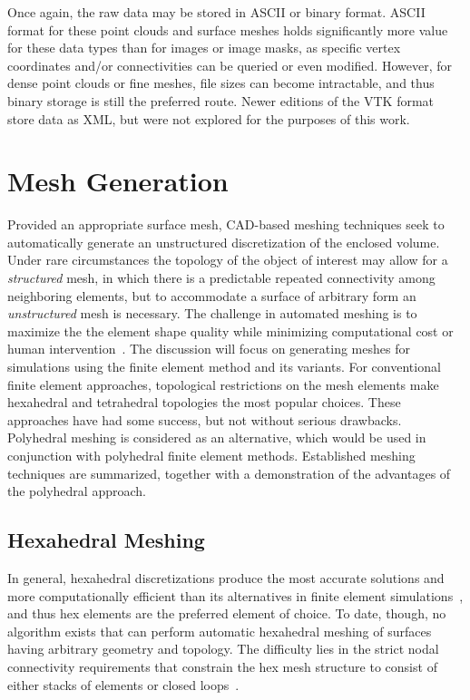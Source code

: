 Once again, the raw data may be stored in ASCII or binary format. ASCII format for these point clouds and surface meshes holds significantly more value for these data types than for images or image masks, as specific vertex coordinates and/or connectivities can be queried or even modified. However, for dense point clouds or fine meshes, file sizes can become intractable, and thus binary storage is still the preferred route. Newer editions of the VTK format store data as XML, but were not explored for the purposes of this work.

\section{Mesh Generation}
%
Provided an appropriate surface mesh, CAD-based meshing techniques seek to automatically generate an unstructured discretization of the enclosed volume. Under rare circumstances the topology of the object of interest may allow for a \textit{structured} mesh, in which there is a predictable repeated connectivity among neighboring elements, but to accommodate a surface of arbitrary form an \textit{unstructured} mesh is necessary. The challenge in automated meshing is to maximize the the element shape quality while minimizing computational cost or human intervention~\cite{blacker_2001}. The discussion will focus on generating meshes for simulations using the finite element method and its variants. For conventional finite element approaches, topological restrictions on the mesh elements make hexahedral and tetrahedral topologies the most popular choices. These approaches have had some success, but not without serious drawbacks. Polyhedral meshing is considered as an alternative, which would be used in conjunction with polyhedral finite element methods. Established meshing techniques are summarized, together with a demonstration of the advantages of the polyhedral approach.

\subsection{Hexahedral Meshing}
\label{Hexahedral Meshing}

In general, hexahedral discretizations produce the most accurate solutions and more computationally efficient than its alternatives in finite element simulations~\cite{tautges_2001}, and thus hex elements are the preferred element of choice. To date, though, no algorithm exists that can perform automatic hexahedral meshing of surfaces having arbitrary geometry and topology. The difficulty lies in the strict nodal connectivity requirements that constrain the hex mesh structure to consist of either stacks of elements or closed loops~\cite{young_2008}. 

